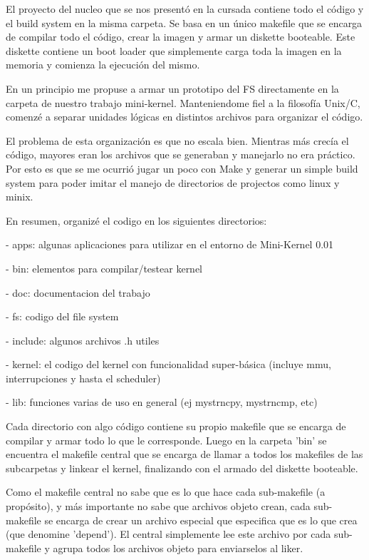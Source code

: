 El proyecto del nucleo que se nos presentó en la cursada contiene todo el código
y el build system en la misma carpeta. Se basa en un único makefile que se
encarga de compilar todo el código, crear la imagen y armar un diskette booteable.
Este diskette contiene un boot loader que simplemente carga toda la imagen en la
memoria y comienza la ejecución del mismo.

En un principio me propuse a armar un prototipo del FS directamente en la
carpeta de nuestro trabajo mini-kernel. Manteniendome fiel a la filosofía
Unix/C, comenzé a separar unidades lógicas en distintos archivos para organizar
el código.

El problema de esta organización es que no escala bien. Mientras más crecía el
código, mayores eran los archivos que se generaban y manejarlo no era práctico.
Por esto es que se me ocurrió jugar un poco con Make y generar un simple build
system para poder imitar el manejo de directorios de projectos como linux y
minix.

En resumen, organizé el codigo en los siguientes directorios:

- apps: algunas aplicaciones para utilizar en el entorno de Mini-Kernel 0.01

- bin: elementos para compilar/testear kernel

- doc: documentacion del trabajo

- fs: codigo del file system

- include: algunos archivos .h utiles

- kernel: el codigo del kernel con funcionalidad super-básica (incluye mmu,
interrupciones y hasta el scheduler)

- lib: funciones varias de uso en general (ej mystrncpy, mystrncmp, etc)

Cada directorio con algo código contiene su propio makefile que se
encarga de compilar y armar todo lo que le corresponde. Luego en la carpeta
'bin' se encuentra el makefile central que se encarga de llamar a todos los
makefiles de las subcarpetas y linkear el kernel, finalizando con el armado del
diskette booteable.

Como el makefile central no sabe que es lo que hace cada sub-makefile (a
propósito), y más importante no sabe que archivos objeto crean, cada
sub-makefile se encarga de crear un archivo especial que especifica que es lo
que crea (que denomine 'depend'). El central simplemente lee este archivo por
cada sub-makefile y agrupa todos los archivos objeto para enviarselos al liker.

